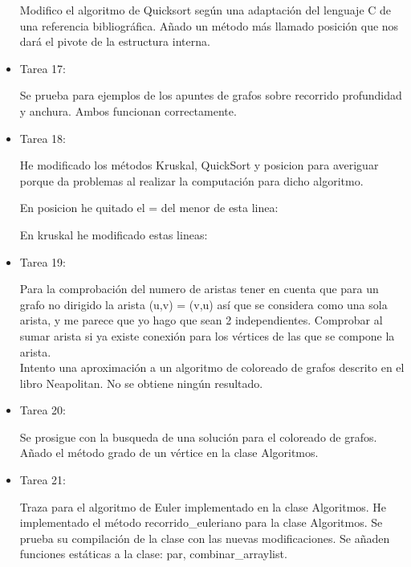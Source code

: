 \begin{itemize}
Modifico el algoritmo de Quicksort según una adaptación del lenguaje C de una referencia bibliográfica. Añado un método más llamado posición que nos dará el pivote de la estructura interna.\\ 

\item Tarea 17:

Se prueba para ejemplos de los apuntes de grafos sobre recorrido profundidad y anchura. Ambos funcionan correctamente.\\

\item Tarea 18:

He modificado los métodos Kruskal, QuickSort y posicion para averiguar porque da problemas al realizar la computación para dicho algoritmo.

En posicion he quitado el = del menor de esta linea:



En kruskal he modificado estas lineas:



\item Tarea 19:

Para la comprobación del numero de aristas tener en cuenta que para un grafo no dirigido la arista (u,v) = (v,u) así que se considera como una sola arista, y me parece que yo hago que sean 2 independientes. Comprobar al sumar arista si ya existe conexión para los vértices de las que se compone la arista.\\

Intento una aproximación a un algoritmo de coloreado de grafos descrito en el libro Neapolitan. No se obtiene ningún resultado.\\

\item Tarea 20:

Se prosigue con la busqueda de una solución para el coloreado de grafos. Añado el método grado de un vértice en la clase Algoritmos.\\

\item Tarea 21:

Traza para el algoritmo de Euler implementado en la clase Algoritmos. He implementado el método recorrido\_euleriano para la clase Algoritmos. Se prueba su compilación de la clase con las nuevas modificaciones. Se añaden funciones estáticas a la clase: par, combinar\_arraylist.\\


\end{itemize}
